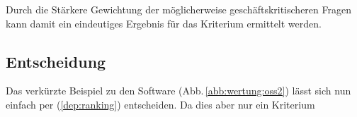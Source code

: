 Durch die Stärkere Gewichtung der möglicherweise geschäftskritischeren Fragen kann damit ein eindeutiges Ergebnis für das Kriterium ermittelt werden.

\subsection{Entscheidung}

Das verkürzte Beispiel zu den Software (Abb.\,\ref{abb:wertung:oss2}) lässt sich nun einfach per  (\ref{dep:ranking}) entscheiden.
Da dies aber nur ein Kriterium  

